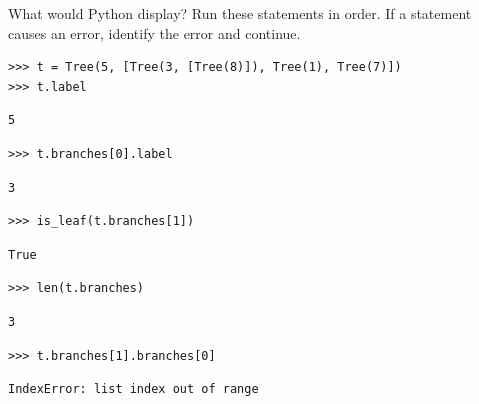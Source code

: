 \question What would Python display? Run these statements in order.
If a statement causes an error, identify the error and continue.

\begin{blocksection}
\begin{lstlisting}
>>> t = Tree(5, [Tree(3, [Tree(8)]), Tree(1), Tree(7)])
>>> t.label
\end{lstlisting}
\begin{solution}[.35in]
\begin{lstlisting}
5
\end{lstlisting}
\end{solution}
\end{blocksection}

\begin{blocksection}
\begin{lstlisting}
>>> t.branches[0].label
\end{lstlisting}
\begin{solution}[.35in]
\begin{lstlisting}
3
\end{lstlisting}
\end{solution}
\end{blocksection}

\begin{blocksection}
\begin{lstlisting}
>>> is_leaf(t.branches[1])
\end{lstlisting}
\begin{solution}[.35in]
\begin{lstlisting}
True
\end{lstlisting}
\end{solution}
\end{blocksection}

\begin{blocksection}
\begin{lstlisting}
>>> len(t.branches)
\end{lstlisting}
\begin{solution}[.35in]
\begin{lstlisting}
3
\end{lstlisting}
\end{solution}
\end{blocksection}

\begin{blocksection}
\begin{lstlisting}
>>> t.branches[1].branches[0]
\end{lstlisting}
\begin{solution}[.35in]
\begin{lstlisting}
IndexError: list index out of range
\end{lstlisting}
\end{solution}
\end{blocksection}

